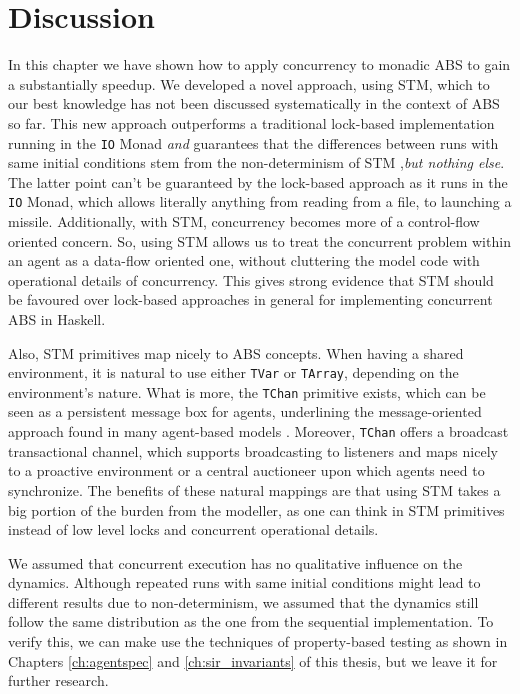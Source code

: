 \section{Discussion}
In this chapter we have shown how to apply concurrency to monadic ABS to gain a substantially speedup. We developed a novel approach, using STM, which to our best knowledge has not been discussed systematically in the context of ABS so far. This new approach outperforms a traditional lock-based implementation running in the \texttt{IO} Monad \textit{and} guarantees that the differences between runs with same initial conditions stem from the non-determinism of STM ,\textit{but nothing else}. The latter point can't be guaranteed by the lock-based approach as it runs in the \texttt{IO} Monad, which allows literally anything from reading from a file, to launching a missile. Additionally, with STM, concurrency becomes more of a control-flow oriented concern. So, using STM allows us to treat the concurrent problem within an agent as a data-flow oriented one, without cluttering the model code with operational details of concurrency. This gives strong evidence that STM should be favoured over lock-based approaches in general for implementing concurrent ABS in Haskell.

Also, STM primitives map nicely to ABS concepts. When having a shared environment, it is natural to use either \texttt{TVar} or \texttt{TArray}, depending on the environment's nature. What is more, the \texttt{TChan} primitive exists, which can be seen as a persistent message box for agents, underlining the message-oriented approach found in many agent-based models \cite{agha_actors:_1986, wooldridge_introduction_2009}. Moreover, \texttt{TChan} offers a broadcast transactional channel, which supports broadcasting to listeners and maps nicely to a proactive environment or a central auctioneer upon which agents need to synchronize. The benefits of these natural mappings are that using STM takes a big portion of the burden from the modeller, as one can think in STM primitives instead of low level locks and concurrent operational details. 

We assumed that concurrent execution has no qualitative influence on the dynamics. Although repeated runs with same initial conditions might lead to different results due to non-determinism, we assumed that the dynamics still follow the same distribution as the one from the sequential implementation. To verify this, we can make use the techniques of property-based testing as shown in Chapters \ref{ch:agentspec} and \ref{ch:sir_invariants} of this thesis, but we leave it for further research.

